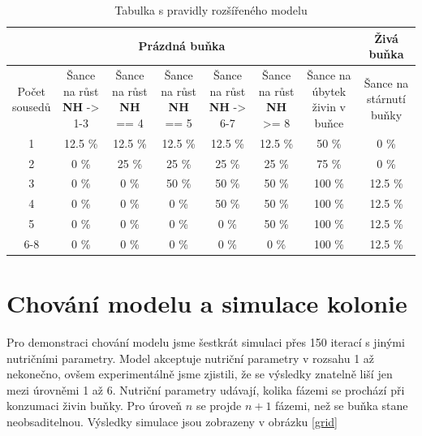 \documentclass{article}
\begin{document}
\begin{table}[ht]
    \centering    
    \begin{tabular}{|c|c|c|c|c|c|c|c|} \hline
        \multicolumn{7}{|c|}{\textbf{Prázdná buňka}} & \textbf{Živá buňka}\\ \hline
        \thead{Počet \\ sousedů} & \thead{Šance na růst \\ \textbf{NH} -> 1-3} & \thead{Šance na růst \\ \textbf{NH} == 4} & \thead{Šance na růst \\ \textbf{NH} == 5 } & \thead{Šance na růst \\ \textbf{NH} -> 6-7} & \thead{Šance na růst \\ \textbf{NH} >= 8} & \thead{Šance na úbytek \\ živin v buňce} & \thead{Šance na \\ stárnutí buňky} \\ \hline
                1   &  12.5 \%   &   12.5 \%   &   12.5 \%  &   12.5 \%  &  12.5 \%  &   50 \%  &      0 \% \\ \hline
                2   &     0 \%   &     25 \%   &     25 \%  &     25 \%  &    25 \%  &   75 \%  &      0 \% \\ \hline
                3   &     0 \%   &      0 \%   &     50 \%  &     50 \%  &    50 \%  &  100 \%  &   12.5 \% \\ \hline
                4   &     0 \%   &      0 \%   &      0 \%  &     50 \%  &    50 \%  &  100 \%  &   12.5 \% \\ \hline
                5   &     0 \%   &      0 \%   &      0 \%  &      0 \%  &    50 \%  &  100 \%  &   12.5 \% \\ \hline
               6-8  &     0 \%   &      0 \%   &      0 \%  &      0 \%  &     0 \%  &  100 \%  &   12.5 \% \\ \hline
    \end{tabular}
    \caption{Tabulka s pravidly rozšířeného modelu}
    \label{model2ext_cellaging_table}
\end{table}

\section{Chování modelu a simulace kolonie}
Pro demonstraci chování modelu jsme šestkrát simulaci přes 150 iterací s jinými nutričními parametry. Model akceptuje nutriční parametry v rozsahu 1 až nekonečno, ovšem experimentálně jsme zjistili, že se výsledky znatelně liší jen mezi úrovněmi 1 až 6. Nutriční parametry udávají, kolika fázemi se prochází při konzumaci živin buňky. Pro úroveň $n$ se projde $n + 1$ fázemi, než se buňka stane neobsaditelnou. Výsledky simulace jsou zobrazeny v obrázku
\ref{grid}
\end{document}
